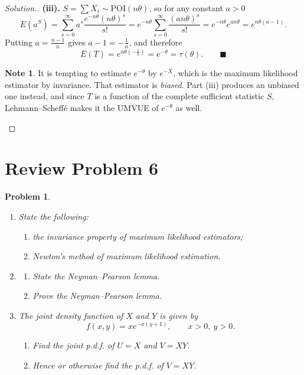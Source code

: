 \documentclass[12pt,a4paper]{report}
\theoremstyle{definition}
\newtheorem{note}[thm]{Note}
\theoremstyle{plain}
\newtheorem{problemx}{Problem}[section]
\newenvironment{problem}{\begin{problemx}}{\end{problemx}}
\newenvironment{solution}
  {\renewcommand{\qedsymbol}{}\begin{proof}[\textit{Solution}.]}
  {\end{proof}}
\begin{document}
\begin{solution}
\textbf{(iii).} $S=\sum X_i\sim\text{POI}(n\theta)$, so for any constant $a>0$
\[E\left(a^S\right)=\sum_{s=0}^\infty a^s\frac{e^{-n\theta}(n\theta)^s}{s!}
=e^{-n\theta}\sum_{s=0}^\infty\frac{(an\theta)^s}{s!}
=e^{-n\theta}e^{an\theta}=e^{n\theta(a-1)}.\]
Putting $a=\frac{n-1}{n}$ gives $a-1=-\frac{1}{n}$, and therefore
\[E(T)=e^{n\theta\left(-\frac{1}{n}\right)}=e^{-\theta}=\tau(\theta).
\qquad\blacksquare\]

\begin{note}
It is tempting to estimate $e^{-\theta}$ by $e^{-\bar X}$, which is the maximum
likelihood estimator by invariance. That estimator is \emph{biased}. Part (iii)
produces an unbiased one instead, and since $T$ is a function of the complete
sufficient statistic $S$, Lehmann--Scheff\'e makes it the UMVUE of $e^{-\theta}$
as well.
\end{note}
\end{solution}

\section{Review Problem 6}

\begin{problem}
\begin{enumerate}
\item[(a).] State the following:
  \begin{enumerate}
  \item[(i).] the invariance property of maximum likelihood estimators;
  \item[(ii).] Newton's method of maximum likelihood estimation.
  \end{enumerate}
\item[(b).]
  \begin{enumerate}
  \item[(i).] State the Neyman--Pearson lemma.
  \item[(ii).] Prove the Neyman--Pearson lemma.
  \end{enumerate}
\item[(c).] The joint density function of $X$ and $Y$ is given by
\[f(x,y)=xe^{-x(y+1)},\qquad x>0,\ y>0.\]
  \begin{enumerate}
  \item[(i).] Find the joint p.d.f. of $U=X$ and $V=XY$.
  \item[(ii).] Hence or otherwise find the p.d.f. of $V=XY$.
  \end{enumerate}
\end{enumerate}
\end{problem}
\end{document}
